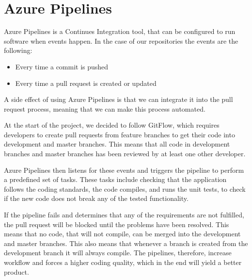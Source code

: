 \section{Azure Pipelines}\label{sec:AzurePipelines}
\label{azurepipelines}
Azure Pipelines is a Continues Integration tool, that can be configured to run software when events happen.
In the case of our repositories the events are the following:
\begin{itemize}
    \item Every time a commit is pushed
    \item Every time a pull request is created or updated
\end{itemize}

A side effect of using Azure Pipelines is that we can integrate it into the pull request process, meaning that we can make this process automated. 

At the start of the project, we decided to follow GitFlow, which requires developers to create pull requests from feature branches to get their code into development and master branches.
This means that all code in development branches and master branches has been reviewed by at least one other developer.

Azure Pipelines then listens for these events and triggers the pipeline to perform a predefined set of tasks.
These tasks include checking that the application follows the coding standards, the code compiles, and runs the unit tests, to check if the new code does not break any of the tested functionality. 

If the pipeline fails and determines that any of the requirements are not fulfilled, the pull request will be blocked until the problems have been resolved.
This means that no code, that will not compile, can be merged into the development and master branches.
This also means that whenever a branch is created from the development branch it will always compile.
The pipelines, therefore, increase workflow and forces a higher coding quality, which in the end will yield a better product.